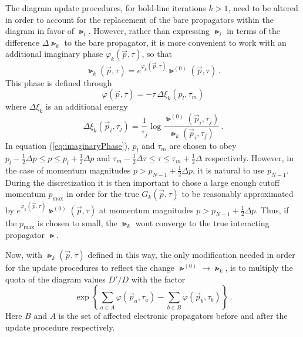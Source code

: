 The diagram update procedures, for bold-line iterations $ k > 1 $, need to be altered in order to account for the replacement of the bare propagators within the diagram in favor of $ \Gt_i $. However, rather than expressing $ \Gt_i $ in terms of the difference $ \Delta \Gt_k $ to the bare propagator, it is more convenient to work with an additional imaginary phase $ \varphi_k (\vec p, \tau) $, so that
\begin{equation}
	\Gt_k(\vec p, \tau) = e^{\varphi_k (\vec p, \tau)} \Gt^{(0)}(\vec p, \tau) \,.
\end{equation}
This phase is defined through
\begin{equation}
	\label{eq:imaginaryPhase}
	\varphi(\vec p, \tau) = - \tau \, \Delta \xi_k( p_l, \tau_m)
\end{equation}
where $ \Delta \xi_k $ is an additional energy
\begin{equation}
	\Delta \xi_k(\vec p_i, \tau_j) = \frac{1}{\tau_j} \log \frac{\Gt^{(0)}(\vec p_i, \tau_j)}{\Gt_k(\vec p_i, \tau_j)} \,.
\end{equation}
In equation (\ref{eq:imaginaryPhase}), $ p_l $ and $ \tau_m $ are chosen to obey $ p_l - \tfrac{1}{2} \Delta p \leq p \leq p_l + \tfrac{1}{2} \Delta p $ and $ \tau_m - \tfrac{1}{2} \Delta \tau \leq \tau \leq \tau_m + \tfrac{1}{2} \Delta $ respectively. However, in the case of momentum magnitudes $ p > p_{N-1} + \tfrac{1}{2} \Delta p $, it is natural to use $ p_{N-1} $. During the discretization it is then important to chose a large enough cutoff momentum $ p_\text{max} $ in order for the true $ G_k(\vec p, \tau) $ to be reasonably approximated by $ e^{\varphi_k (\vec p, \tau)} \Gt^{(0)}(\vec p, \tau) $ at momentum magnitudes $ p > p_{N-1} + \tfrac{1}{2} \Delta p $. Thus, if the $ p_\text{max} $ is chosen to small, the $ \Gt_k $ wont converge to the true interacting propagator $ \Gt $.

Now, with $ \Gt_k (\vec p, \tau) $ defined in this way, the only modification needed in order for the update procedures to reflect the change $ \Gt^{(0)} \rightarrow \Gt_k $, is to multiply the quota of the diagram values $ D'/ D $ with the factor
\begin{equation}
	\exp \left\{ \sum_{a \in A} \varphi(\vec p_a, \tau_a) - \sum_{b \in B} \varphi(\vec p_b, \tau_b) \right\} \,.
\end{equation}
Here $ B $ and $ A $ is the set of affected electronic propagators before and after the update procedure respectively.

